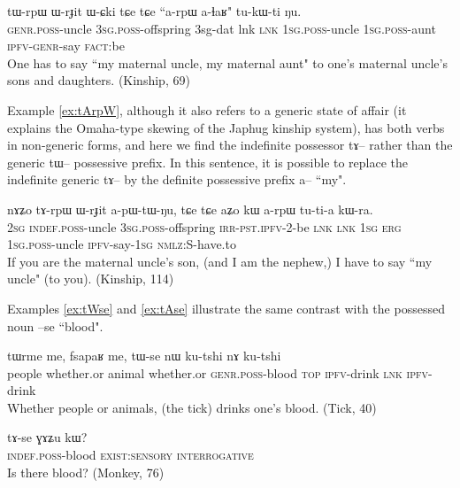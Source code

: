 \documentclass[oldfontcommands,oneside,a4paper,11pt]{article}
\newcommand{\ipa}[1]{{\phon \mbox{#1}}} %
\begin{document}
\begin{exe}
\ex \label{ex:tWrpW}
\gll
 \ipa{tɯ-rpɯ} 	\ipa{ɯ-rɟit} 	\ipa{ɯ-ɕki} 	\ipa{tɕe} 	\ipa{tɕe} 	``\ipa{a-rpɯ} \ipa{a-ɬaʁ}" 	\ipa{tu-kɯ-ti} 	\ipa{ŋu.} \\
\textsc{genr.poss}-uncle \textsc{3sg.poss}-offspring 3sg-dat lnk \textsc{lnk} \textsc{1sg.poss}-uncle \textsc{1sg.poss}-aunt \textsc{ipfv-genr}-say \textsc{fact}:be \\
\glt One has to say ``my maternal uncle, my maternal aunt" to one's maternal uncle's sons and daughters. (Kinship, 69)
\end{exe}

Example \ref{ex:tArpW}, although it also refers to a generic state of affair (it explains the Omaha-type skewing of the Japhug kinship system), has both verbs in non-generic forms, and here we find the indefinite possessor \ipa{tɤ--} rather than the generic \ipa{tɯ--} possessive prefix. In this sentence, it is possible to replace the indefinite generic \ipa{tɤ--} by the definite possessive prefix \ipa{a--} ``my".

\begin{exe}
\ex  \label{ex:tArpW}
\gll
\ipa{nɤʑo} 	\ipa{tɤ-rpɯ} 	\ipa{ɯ-rɟit} 	\ipa{a-pɯ-tɯ-ŋu,} 	\ipa{tɕe} 	\ipa{tɕe} 	\ipa{aʑo} 	\ipa{kɯ} 	\ipa{a-rpɯ} 	\ipa{tu-ti-a} 	\ipa{kɯ-ra.}  \\
\textsc{2sg} \textsc{indef.poss}-uncle \textsc{3sg.poss}-offspring \textsc{irr-pst.ipfv}-2-be \textsc{lnk} \textsc{lnk} \textsc{1sg} \textsc{erg}  \textsc{1sg.poss}-uncle \textsc{ipfv}-say-\textsc{1sg} \textsc{nmlz:S}-have.to  \\
\glt If you are the maternal uncle's son, (and I am the nephew,) I have to say ``my uncle" (to you).  (Kinship, 114)
\end{exe}

Examples \ref{ex:tWse} and \ref{ex:tAse} illustrate the same contrast with the possessed noun \ipa{--se} ``blood".
\begin{exe}
\ex  \label{ex:tWse}
\gll
\ipa{tɯrme} 	\ipa{me,} 	\ipa{fsapaʁ} 	\ipa{me,} 	\ipa{tɯ-se} 	\ipa{nɯ} 	\ipa{ku-tshi} 	\ipa{nɤ} 	\ipa{ku-tshi} \\
people whether.or animal whether.or \textsc{genr.poss}-blood \textsc{top} \textsc{ipfv}-drink \textsc{lnk} \textsc{ipfv}-drink \\
\glt Whether people or animals, (the tick) drinks one's blood. (Tick, 40)
\end{exe}

\begin{exe}
\ex  \label{ex:tAse}
\gll
\ipa{tɤ-se} 	\ipa{ɣɤʑu} 	\ipa{kɯ?} \\
\textsc{indef.poss}-blood \textsc{exist:sensory} \textsc{interrogative} \\
\glt Is there blood? (Monkey, 76)
\end{exe}
\end{document}
